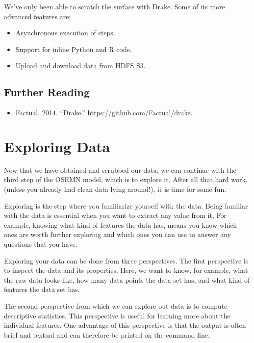 \documentclass[
]{book}
\providecommand{\tightlist}{%
  \setlength{\itemsep}{0pt}\setlength{\parskip}{0pt}}
\theoremstyle{definition}
\theoremstyle{definition}
\theoremstyle{definition}
\theoremstyle{remark}
\begin{document}
We've only been able to scratch the surface with Drake. Some of its more advanced features are:

\begin{itemize}
\tightlist
\item
  Asynchronous execution of steps.
\item
  Support for inline Python and R code.
\item
  Upload and download data from HDFS S3.
\end{itemize}

\hypertarget{further-reading}{%
\section{Further Reading}\label{further-reading}}

\begin{itemize}
\tightlist
\item
  Factual. 2014. ``Drake.'' https://github.com/Factual/drake.
\end{itemize}

\hypertarget{chapter-7-exploring-data}{%
\chapter{Exploring Data}\label{chapter-7-exploring-data}}

Now that we have obtained and scrubbed our data, we can continue with the third step of the OSEMN model, which is to explore it. After all that hard work, (unless you already had clean data lying around!), it is time for some fun.

Exploring is the step where you familiarize yourself with the data. Being familiar with the data is essential when you want to extract any value from it. For example, knowing what kind of features the data has, means you know which ones are worth further exploring and which ones you can use to answer any questions that you have.

Exploring your data can be done from three perspectives. The first perspective is to inspect the data and its properties. Here, we want to know, for example, what the raw data looks like, how many data points the data set has, and what kind of features the data set has.

The second perspective from which we can explore out data is to compute descriptive statistics. This perspective is useful for learning more about the individual features. One advantage of this perspective is that the output is often brief and textual and can therefore be printed on the command line.
\end{document}
